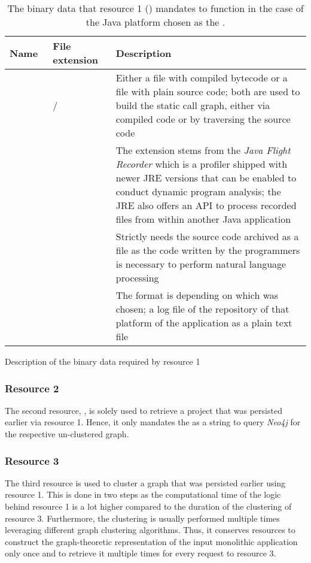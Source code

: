 \documentclass[12pt,a4paper]{report}
\begin{document}
\begin{table}[ht!]
\smaller
\def\arraystretch{1.55}
\begin{tabularx}{\textwidth}{|Y|Y|Y|}
 \hline
 Name~ & File extension~ & Description~ \\
 \hline\hline
          &  /  &
 Either a  file with compiled bytecode or a  file with plain source code;
 both are used to build the static call graph, either via compiled code or by traversing the source code \\\hline
         &  &
 The  extension stems from the \textit{Java Flight Recorder} which is a profiler shipped with newer
 JRE versions that can be enabled to conduct dynamic program analysis; the JRE also offers an API to process
 recorded  files from within another Java application \\\hline
        &  &
 Strictly needs the source code archived as a  file as the code written by the programmers
 is necessary to perform natural language processing \\\hline
    &  &
 The format is depending on which  was chosen; a log file of the repository of that platform
 of the application as a plain text file \\\hline
\end{tabularx}
\caption{Description of the binary data required by resource 1}
\caption*{
  The binary data that resource 1 () mandates to function
  in the case of the Java platform chosen as the .
}
\label{table:binary-data-resource-1}
\end{table}


\subsubsection{Resource 2}
The second resource, , is solely used to
retrieve a project that was persisted earlier via resource 1. Hence, it only
mandates the  as a string to query \textit{Neo4j} for the
respective un\hyp clustered graph.


\subsubsection{Resource 3}
The third resource is used to cluster a graph that was persisted earlier using
resource 1. This is done in two steps as the computational time of the logic
behind resource 1 is a lot higher compared to the duration of the clustering
of resource 3. Furthermore, the clustering is usually performed multiple times
leveraging different graph clustering algorithms. Thus, it conserves resources
to construct the graph-theoretic representation of the input monolithic application
only once and to retrieve it multiple times for every request to resource 3.
\end{document}
